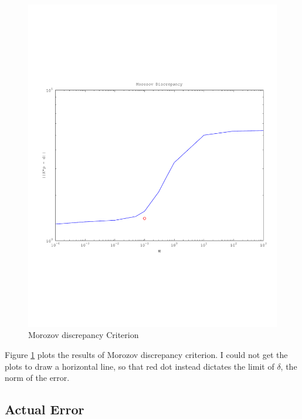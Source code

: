 \documentclass{article}
\begin{document}
\begin{figure}[!htb]
  \includegraphics[scale=.5]{plots/morozov.pdf}
  \caption{Morozov discrepancy Criterion} 
 \label{fig:moro}
\end{figure}

Figure \ref{fig:moro} plots the results of Morozov discrepancy
criterion. I could not get the plots to draw a horizontal line, so that
red dot instead dictates the limit of $\delta$, the norm of the error. 


\subsection{Actual Error}
\end{document}
